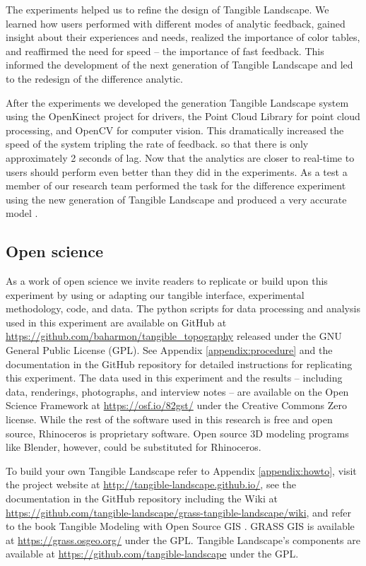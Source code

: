 \documentclass[prodmode,acmtochi]{acmsmall} %
\begin{document}
The experiments helped us to refine the design of Tangible Landscape. 
%
We learned how users performed with different modes of analytic feedback, 
gained insight about their experiences and needs,
realized the importance of color tables, 
and reaffirmed the need for speed -- the importance of fast feedback. 
%
This informed the development of the next generation of Tangible Landscape 
and led to the redesign of the difference analytic. 

After the experiments
we developed the  generation Tangible Landscape system
using 
the OpenKinect project for drivers,
the Point Cloud Library for point cloud processing, 
and OpenCV for computer vision. 
%
This dramatically increased the speed of the system
tripling the rate of feedback.
so that there is only approximately 2 seconds of lag. 
%
Now that the analytics are closer to real-time to
users should perform even better than they did in the experiments.
%
As a test a member of our research team 
performed the task for the difference experiment 
using the new generation of Tangible Landscape
and produced a very accurate model \cite{ncsu_geoforall_2016}. 


\subsection{Open science}
As a work of open science we invite readers to
replicate or build upon this experiment by 
using or adapting our tangible interface, experimental methodology, code, and data. 
The python scripts for data processing and analysis used in this experiment 
are available on GitHub at 
\url{https://github.com/baharmon/tangible_topography}
released under the GNU General Public License (GPL). 
See Appendix \ref{appendix:procedure}
and the documentation in the GitHub repository 
for detailed instructions for replicating this experiment. 
The data used in this experiment 
and the results -- 
including data, renderings, photographs, and interview notes --
are available on the Open Science Framework 
at \url{https://osf.io/82gst/} under the Creative Commons Zero license.
While the rest of the software used in this research is free and open source, 
Rhinoceros is proprietary software. 
Open source 3D modeling programs like 
Blender, however,
could be substituted for Rhinoceros. 

To build your own Tangible Landscape
refer to Appendix \ref{appendix:howto},
visit the project website at \url{http://tangible-landscape.github.io/}, 
see the documentation in the GitHub repository 
including the Wiki at \url{https://github.com/tangible-landscape/grass-tangible-landscape/wiki},
and refer to the book Tangible Modeling with Open Source GIS \cite{Petrasova2015}.
GRASS GIS is available at
\url{https://grass.osgeo.org/} 
under the GPL. 
Tangible Landscape's components are available at
\url{https://github.com/tangible-landscape}
under the GPL. 
\end{document}
